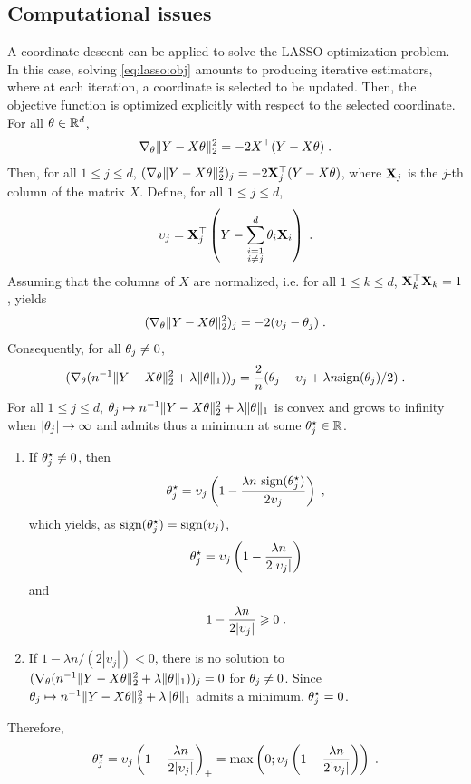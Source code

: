 \subsection{Computational issues}
A coordinate descent can be applied to solve the LASSO optimization problem. In this case, solving \eqref{eq:lasso:obj} amounts to producing iterative estimators, where at each iteration, a coordinate is selected to be updated. Then, the objective function  is optimized explicitly  with respect to the selected coordinate. For all $\theta \in \mathbb{R}^d$,  
\[
\nabla_\theta \|Y - X\theta\|_2^2 = - 2 X^\top (Y-X\theta)\;.
\]
Then, for all $1\leqslant j \leqslant d$, $(\nabla_\theta \|Y - X\theta\|_2^2)_j = -2 {\bf X}^\top_j (Y-X\theta)$, where ${\bf X}_j$ is the $j$-th column of the matrix $X$. 
Define, for all $1\leqslant j \leqslant d$,
\[
\upsilon_{j}={\bf X}^\top_{j}\left(Y-\sum_{\substack{i=1\\ i\neq j}}^d\theta_{i}{\bf X}_{i}\right)\;.
\]
Assuming that the columns of $X$ are normalized, i.e. for all $1\leqslant k \leqslant d$, ${\bf X}^\top_{k}{\bf X}_{k}=1$, yields
\[
(\nabla_\theta \|Y - X\theta\|_2^2)_j = -2( \upsilon_j - \theta_j)\;.
\]
Consequently, for all $\theta_j \neq 0$, 
\[
(\nabla_\theta ( n^{-1}\|Y - X\theta\|_2^2 +  \lambda\|\theta\|_1))_j= \frac{2}{n}( \theta_j - \upsilon_j + \lambda n\textrm{sign}(\theta_j)/2)\;.
\]
For all $1\leqslant j\leqslant d$,  $\theta_j \mapsto  n^{-1}\|Y - X\theta\|_2^2 + \lambda\|\theta\|_1$ is convex and grows to infinity when $|\theta_j|\to \infty$ and admits thus a minimum at some $\theta_j^{\star}\in\mathbb{R}$. 
\begin{enumerate}[-]
\item If $\theta_j^{\star} \neq 0$, then
\[
\theta_j^{\star} = \upsilon_j\left( 1 - \frac{\lambda n~\textrm{sign}(\theta_j^{\star})}{2 \upsilon_j}\right)\;,
\]
which yields, as  $\textrm{sign}(\theta_j^{\star}) = \textrm{sign}(\upsilon_j)$,
\[
\theta_j^{\star} = \upsilon_j\left(1 - \frac{\lambda n }{2 |\upsilon_j|}\right)
\]
and
\[
1 - \frac{\lambda n }{2 |\upsilon_j|} \geqslant 0\;.
\]
\item If $1 - \lambda n/(2 |\upsilon_j|)<0$, there is no solution to $(\nabla_\theta ( n^{-1}\|Y - X\theta\|_2^2 +  \lambda\|\theta\|_1))_j=0$ for $\theta_j \neq 0$.  Since $\theta_j \mapsto  n^{-1}\|Y - X\theta\|_2^2 + \lambda\|\theta\|_1$ admits a minimum, $\theta_j^{\star}=0$. 
\end{enumerate}
Therefore,
\[
\theta_j^{\star} = \upsilon_j\left( 1 - \frac{\lambda n}{2 |\upsilon_j|}\right)_+ = \mathrm{max}\left(0;\upsilon_j\left( 1 - \frac{\lambda n}{2 |\upsilon_j|}\right)\right)\;.
\]
